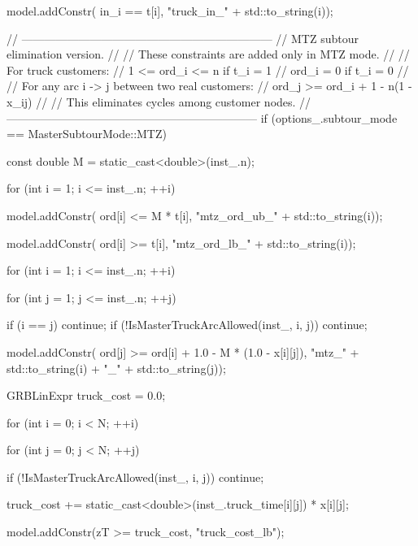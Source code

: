 {{{{                model.addConstr(
                    in_i == t[i],
                    "truck_in_" + std::to_string(i));
            }

            // ------------------------------------------------------------------
            // MTZ subtour elimination version.
            //
            // These constraints are added only in MTZ mode.
            //
            // For truck customers:
            //   1 <= ord_i <= n if t_i = 1
            //   ord_i = 0 if t_i = 0
            //
            // For any arc i -> j between two real customers:
            //   ord_j >= ord_i + 1 - n(1 - x_ij)
            //
            // This eliminates cycles among customer nodes.
            // ------------------------------------------------------------------
            if (options_.subtour_mode == MasterSubtourMode::MTZ)
            {
                const double M = static_cast<double>(inst_.n);

                for (int i = 1; i <= inst_.n; ++i)
                {
                    model.addConstr(
                        ord[i] <= M * t[i],
                        "mtz_ord_ub_" + std::to_string(i));

                    model.addConstr(
                        ord[i] >= t[i],
                        "mtz_ord_lb_" + std::to_string(i));
                }

                for (int i = 1; i <= inst_.n; ++i)
                {
                    for (int j = 1; j <= inst_.n; ++j)
                    {
                        if (i == j)
                            continue;
                        if (!IsMasterTruckArcAllowed(inst_, i, j))
                            continue;

                        model.addConstr(
                            ord[j] >= ord[i] + 1.0 - M * (1.0 - x[i][j]),
                            "mtz_" + std::to_string(i) + "_" + std::to_string(j));
                    }
                }
            }

            GRBLinExpr truck_cost = 0.0;

            for (int i = 0; i < N; ++i)
            {
                for (int j = 0; j < N; ++j)
                {
                    if (!IsMasterTruckArcAllowed(inst_, i, j))
                        continue;

                    truck_cost += static_cast<double>(inst_.truck_time[i][j]) * x[i][j];
                }
            }

            model.addConstr(zT >= truck_cost, "truck_cost_lb");

}}}

